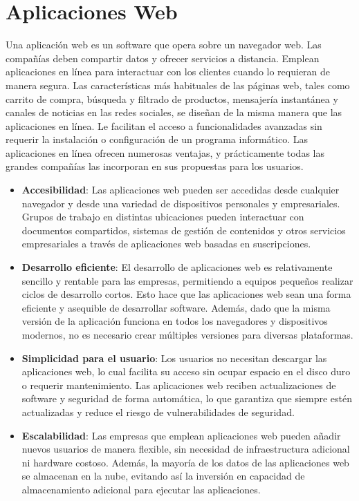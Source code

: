 \section{Aplicaciones Web}
Una aplicación web es un software que opera sobre un navegador web. Las compañías deben compartir datos y ofrecer servicios a distancia. Emplean aplicaciones en línea para interactuar con los clientes cuando lo requieran de manera segura. Las características más habituales de las páginas web, tales como carrito de compra, búsqueda y filtrado de productos, mensajería instantánea y canales de noticias en las redes sociales, se diseñan de la misma manera que las aplicaciones en línea. Le facilitan el acceso a funcionalidades avanzadas sin requerir la instalación o configuración de un programa informático.
Las aplicaciones en línea ofrecen numerosas ventajas, y prácticamente todas las grandes compañías las incorporan en sus propuestas para los usuarios.
\begin{itemize}
	\item \textbf{Accesibilidad}: Las aplicaciones web pueden ser accedidas desde cualquier navegador y desde una variedad de dispositivos personales y empresariales. Grupos de trabajo en distintas ubicaciones pueden interactuar con documentos compartidos, sistemas de gestión de contenidos y otros servicios empresariales a través de aplicaciones web basadas en suscripciones.
	
	\item \textbf{Desarrollo eficiente}: El desarrollo de aplicaciones web es relativamente sencillo y rentable para las empresas, permitiendo a equipos pequeños realizar ciclos de desarrollo cortos. Esto hace que las aplicaciones web sean una forma eficiente y asequible de desarrollar software. Además, dado que la misma versión de la aplicación funciona en todos los navegadores y dispositivos modernos, no es necesario crear múltiples versiones para diversas plataformas.
	
	\item \textbf{Simplicidad para el usuario}: Los usuarios no necesitan descargar las aplicaciones web, lo cual facilita su acceso sin ocupar espacio en el disco duro o requerir mantenimiento. Las aplicaciones web reciben actualizaciones de software y seguridad de forma automática, lo que garantiza que siempre estén actualizadas y reduce el riesgo de vulnerabilidades de seguridad.
	
	\item \textbf{Escalabilidad}: Las empresas que emplean aplicaciones web pueden añadir nuevos usuarios de manera flexible, sin necesidad de infraestructura adicional ni hardware costoso. Además, la mayoría de los datos de las aplicaciones web se almacenan en la nube, evitando así la inversión en capacidad de almacenamiento adicional para ejecutar las aplicaciones.
\end{itemize}



